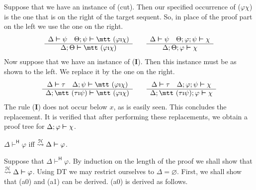 Suppose that we have an instance of (cut). Then our specified 
occurrence of {\mtt ($\varphi$$\chi$)} is the one 
that is on the right of the target sequent. So, in place of the 
proof part on the left we use the one on the right.
\begin{equation}
\begin{array}{c}
\Delta\bvdash\psi \quad \Theta;\psi \bvdash 
	\mbox{\mtt ($\varphi$\symbol{25}$\chi$)} \\\hline
\Delta;\Theta \bvdash\mbox{\mtt ($\varphi$\symbol{25}$\chi$)}
\end{array}
\qquad
\begin{array}{c}
\Delta\bvdash\psi \quad \Theta;\varphi;\psi \bvdash \chi\\\hline
\Delta;\Theta;\varphi \bvdash\chi
\end{array}
\end{equation}
Now suppose that we have an instance of ({\mtt{}}\textbf{I}). 
Then this instance must be as shown to the left. We replace it by 
the one on the right.
\begin{equation}
\begin{array}{c}
    \Delta\bvdash\tau \quad \Delta;\psi\bvdash%
    \mbox{\mtt ($\varphi$\symbol{25}$\chi$)} \\\hline
    \Delta;\mbox{\mtt ($\tau$\symbol{25}$\psi$)}\bvdash
        \mbox{\mtt ($\varphi$\symbol{25}$\chi$)}
    \end{array}
\qquad
\begin{array}{c}
\Delta\bvdash\tau \quad \Delta;\phi;\psi\bvdash \chi\\\hline
\Delta;\mbox{\mtt ($\tau$\symbol{25}$\psi$)};\varphi \bvdash \chi
\end{array}
\end{equation}
The rule ({\mtt{}}\textbf{I}) does not occur below $x$, as is 
easily seen. This concludes the replacement. It is verified that after 
performing these replacements, we obtain a proof tree for
$\Delta;\varphi\boldsymbol{\vdash}\chi$.
\proofend
\begin{thm}
$\Delta \vdash^{\mathsf{H}} \varphi$ iff
 $\stackrel{\mathcal{H}}{\rightsquigarrow} \Delta \boldsymbol{\vdash} \varphi$.
\end{thm}
\proofbeg 
Suppose that $\Delta \vdash^{\mathsf{H}} \varphi$. By induction on the 
length of the proof we shall show that 
$\stackrel{\mathcal{H}}{\rightsquigarrow} \Delta \boldsymbol{\vdash} \varphi$. Using DT we may
restrict ourselves to $\Delta = \varnothing$. First, we shall show
that (a0) and (a1) can be derived. (a0) is derived as follows.
